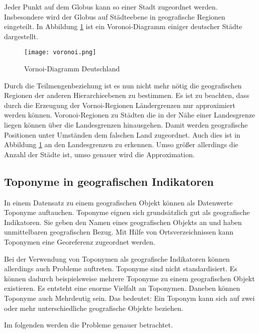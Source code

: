 				Jeder Punkt auf dem Globus kann so einer Stadt zugeordnet werden.
				Insbesondere wird der Globus auf Städteebene in geografische Regionen eingeteilt.
				In Abbildung \ref{img:voronoi} ist ein Voronoi-Diagramm einiger deutscher Städte dargestellt.

				\begin{figure}[h!]
				\begin{center}
				\texttt{[image: voronoi.png]}
				\caption{Vornoi-Diagramm Deutschland}
				\label{img:voronoi}
				\end{center}
				\end{figure}	

				Durch die Teilmengenbeziehung ist es nun nicht mehr nötig die geografischen Regionen der anderen Hierarchieebenen zu bestimmen.
				Es ist zu beachten, dass durch die Erzeugung der Vornoi-Regionen Ländergrenzen nur approximiert werden können. 
				Voronoi-Regionen zu Städten die in der Nähe einer Landesgrenze liegen können über die Landesgrenzen hinausgehen. 
				Damit werden geografische Positionen unter Umständen dem falschen Land zugeordnet.
				Auch dies ist in Abbildung \ref{img:voronoi} an den Landesgrenzen zu erkennen. 
				Umso größer allerdings die Anzahl der Städte ist, umso genauer wird die Approximation. 

		\subsection{Toponyme in geografischen Indikatoren} \label{sec:ToponymeInGeografischenIndikatoren}

			In einem Datensatz zu einem geografischen Objekt können als Datenwerte Toponyme auftauchen.
			Toponyme eignen sich grundsätzlich gut als geografische Indikatoren.
			Sie geben den Namen eines geografischen Objekts an und haben unmittelbaren geografischen Bezug. 
			Mit Hilfe von Ortsverzeichnissen kann Toponymen eine Georeferenz zugeordnet werden.
			
			Bei der Verwendung von Toponymen als geografische Indikatoren können allerdings auch  Probleme auftreten.
			Toponyme sind nicht standardisiert.
			Es können dadurch beispielsweise mehrere Toponyme zu einem geografischen Objekt existieren.
			Es entsteht eine enorme Vielfalt an Toponymen. 
			Daneben können Toponyme auch Mehrdeutig sein.
			Das bedeutet: Ein Toponym kann sich auf zwei oder mehr unterschiedliche geografische Objekte beziehen.

			Im folgenden werden die Probleme genauer betrachtet.


